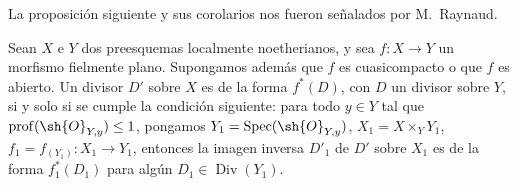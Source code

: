
La proposición siguiente y sus corolarios nos fueron señalados por
M.~Raynaud.

\begin{proposition}[21.4.9]
\ifdefined\EGAIVSuppressErratumLabels\else\label{IV.21.4.9}\fi
Sean $X$ e $Y$ dos preesquemas localmente noetherianos, y sea
$f:X\to Y$ un morfismo fielmente plano. Supongamos además que $f$ es
cuasicompacto \textup{o} que $f$ es abierto. Un divisor $D'$ sobre $X$ es de la
forma $f^*(D)$, con $D$ un divisor sobre $Y$, si y solo si se cumple la
condición siguiente: para todo $y\in Y$ tal que
$\operatorname{prof}(\sh{O}_{Y,y})\leq1$, pongamos
$Y_1=\operatorname{Spec}(\sh{O}_{Y,y})$,
$X_1=X\times_YY_1$,
$f_1=f_{(Y_1)}:X_1\to Y_1$,
entonces la imagen inversa $D'_1$ de $D'$ sobre $X_1$ es de la forma
$f_1^*(D_1)$ para algún $D_1\in\operatorname{Div}(Y_1)$.
\end{proposition}

